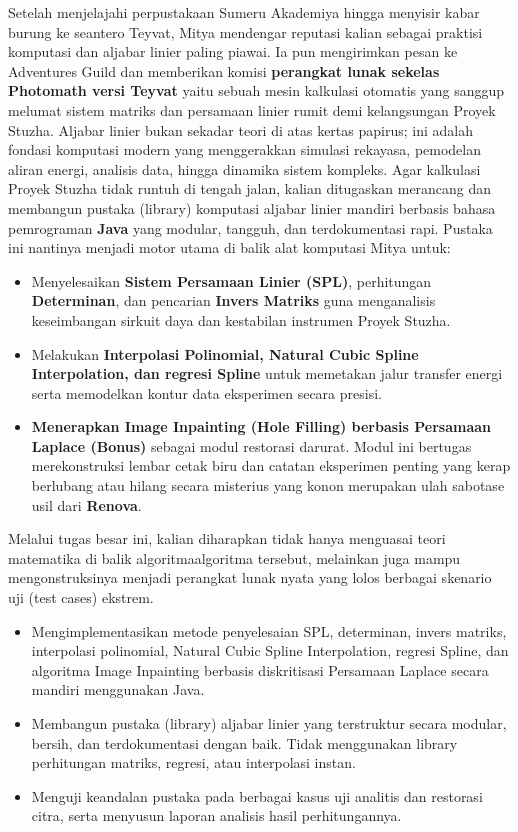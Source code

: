 \documentclass{article}
\begin{document}
Setelah menjelajahi perpustakaan Sumeru Akademiya hingga menyisir kabar burung ke seantero
Teyvat, Mitya mendengar reputasi kalian sebagai praktisi komputasi dan aljabar linier paling piawai.
Ia pun mengirimkan pesan ke Adventures Guild dan memberikan komisi {\bf perangkat lunak sekelas
Photomath versi Teyvat} yaitu sebuah mesin kalkulasi otomatis yang sanggup melumat sistem matriks
dan persamaan linier rumit demi kelangsungan Proyek Stuzha.
Aljabar linier bukan sekadar teori di atas kertas papirus; ini adalah fondasi komputasi modern yang
menggerakkan simulasi rekayasa, pemodelan aliran energi, analisis data, hingga dinamika sistem kompleks. Agar kalkulasi Proyek Stuzha tidak runtuh di tengah jalan, kalian ditugaskan merancang dan
membangun pustaka (library) komputasi aljabar linier mandiri berbasis bahasa pemrograman {\bf Java} yang
modular, tangguh, dan terdokumentasi rapi.
Pustaka ini nantinya menjadi motor utama di balik alat komputasi Mitya untuk:
\begin{itemize}
    \item{Menyelesaikan {\bf Sistem Persamaan Linier (SPL)}, perhitungan {\bf Determinan}, dan pencarian
{\bf Invers Matriks} guna menganalisis keseimbangan sirkuit daya dan kestabilan instrumen Proyek
Stuzha.}
    \item{Melakukan {\bf Interpolasi Polinomial, Natural Cubic Spline Interpolation, dan regresi Spline}
untuk memetakan jalur transfer energi serta memodelkan kontur data eksperimen secara presisi.}
    \item{{\bf Menerapkan Image Inpainting (Hole Filling) berbasis Persamaan Laplace (Bonus)}
sebagai modul restorasi darurat. Modul ini bertugas merekonstruksi lembar cetak biru dan catatan
eksperimen penting yang kerap berlubang atau hilang secara misterius yang konon merupakan ulah
sabotase usil dari {\bf Renova}.}
\end{itemize}
Melalui tugas besar ini, kalian diharapkan tidak hanya menguasai teori matematika di balik algoritmaalgoritma tersebut, melainkan juga mampu mengonstruksinya menjadi perangkat lunak nyata yang lolos
berbagai skenario uji (test cases) ekstrem.

\begin{itemize}
    \item{Mengimplementasikan metode penyelesaian SPL, determinan, invers matriks, interpolasi polinomial, Natural Cubic Spline Interpolation, regresi Spline, dan algoritma Image Inpainting berbasis
diskritisasi Persamaan Laplace secara mandiri menggunakan Java.}
    \item{Membangun pustaka (library) aljabar linier yang terstruktur secara modular, bersih, dan terdokumentasi dengan baik. Tidak menggunakan library perhitungan matriks, regresi, atau interpolasi
instan.}
    \item{Menguji keandalan pustaka pada berbagai kasus uji analitis dan restorasi citra, serta menyusun
laporan analisis hasil perhitungannya.}
\end{itemize}
\end{document}

